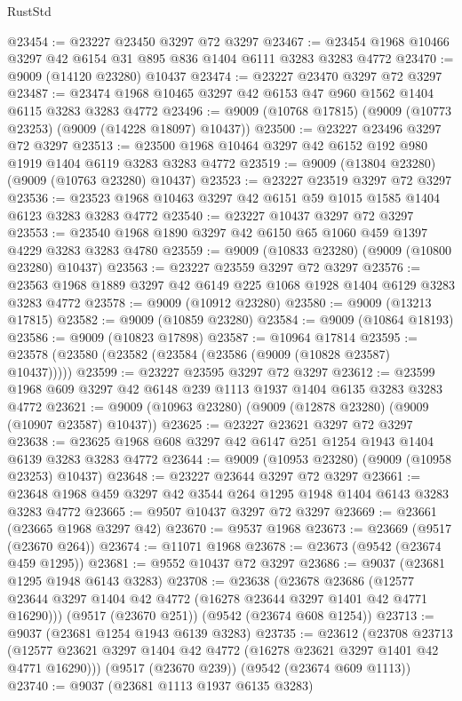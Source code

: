 \begin{lexlean}{RustStd}
\begin{coremodule}
@23454 := @23227 @23450 @3297 @72 @3297
@23467 := @23454 @1968 @10466 @3297 @42 @6154 @31 @895 @836 @1404 @6111 @3283 @3283 @4772
@23470 := @9009 (@14120 @23280) @10437
@23474 := @23227 @23470 @3297 @72 @3297
@23487 := @23474 @1968 @10465 @3297 @42 @6153 @47 @960 @1562 @1404 @6115 @3283 @3283 @4772
@23496 := @9009 (@10768 @17815) (@9009 (@10773 @23253) (@9009 (@14228 @18097) @10437))
@23500 := @23227 @23496 @3297 @72 @3297
@23513 := @23500 @1968 @10464 @3297 @42 @6152 @192 @980 @1919 @1404 @6119 @3283 @3283 @4772
@23519 := @9009 (@13804 @23280) (@9009 (@10763 @23280) @10437)
@23523 := @23227 @23519 @3297 @72 @3297
@23536 := @23523 @1968 @10463 @3297 @42 @6151 @59 @1015 @1585 @1404 @6123 @3283 @3283 @4772
@23540 := @23227 @10437 @3297 @72 @3297
@23553 := @23540 @1968 @1890 @3297 @42 @6150 @65 @1060 @459 @1397 @4229 @3283 @3283 @4780
@23559 := @9009 (@10833 @23280) (@9009 (@10800 @23280) @10437)
@23563 := @23227 @23559 @3297 @72 @3297
@23576 := @23563 @1968 @1889 @3297 @42 @6149 @225 @1068 @1928 @1404 @6129 @3283 @3283 @4772
@23578 := @9009 (@10912 @23280)
@23580 := @9009 (@13213 @17815)
@23582 := @9009 (@10859 @23280)
@23584 := @9009 (@10864 @18193)
@23586 := @9009 (@10823 @17898)
@23587 := @10964 @17814
@23595 := @23578 (@23580 (@23582 (@23584 (@23586 (@9009 (@10828 @23587) @10437)))))
@23599 := @23227 @23595 @3297 @72 @3297
@23612 := @23599 @1968 @609 @3297 @42 @6148 @239 @1113 @1937 @1404 @6135 @3283 @3283 @4772
@23621 := @9009 (@10963 @23280) (@9009 (@12878 @23280) (@9009 (@10907 @23587) @10437))
@23625 := @23227 @23621 @3297 @72 @3297
@23638 := @23625 @1968 @608 @3297 @42 @6147 @251 @1254 @1943 @1404 @6139 @3283 @3283 @4772
@23644 := @9009 (@10953 @23280) (@9009 (@10958 @23253) @10437)
@23648 := @23227 @23644 @3297 @72 @3297
@23661 := @23648 @1968 @459 @3297 @42 @3544 @264 @1295 @1948 @1404 @6143 @3283 @3283 @4772
@23665 := @9507 @10437 @3297 @72 @3297
@23669 := @23661 (@23665 @1968 @3297 @42)
@23670 := @9537 @1968
@23673 := @23669 (@9517 (@23670 @264))
@23674 := @11071 @1968
@23678 := @23673 (@9542 (@23674 @459 @1295))
@23681 := @9552 @10437 @72 @3297
@23686 := @9037 (@23681 @1295 @1948 @6143 @3283)
@23708 := @23638
    (@23678
      @23686
      (@12577 @23644 @3297 @1404 @42 @4772 (@16278 @23644 @3297 @1401 @42 @4771 @16290)))
    (@9517 (@23670 @251))
    (@9542 (@23674 @608 @1254))
@23713 := @9037 (@23681 @1254 @1943 @6139 @3283)
@23735 := @23612
    (@23708
      @23713
      (@12577 @23621 @3297 @1404 @42 @4772 (@16278 @23621 @3297 @1401 @42 @4771 @16290)))
    (@9517 (@23670 @239))
    (@9542 (@23674 @609 @1113))
@23740 := @9037 (@23681 @1113 @1937 @6135 @3283)

\end{coremodule}
\end{lexlean}
